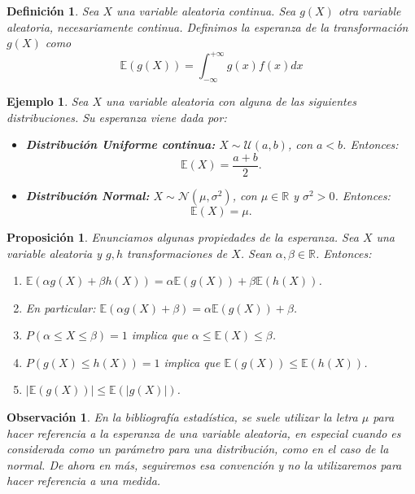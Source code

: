 \documentclass{report}
\newtheorem{prop}{Proposición}[section]
\newtheorem{dfn}{Definición}[section]
\newtheorem{obs}{Observación}[section]
\newtheorem{ej}{Ejemplo}[section]
\begin{document}
\begin{dfn}
Sea $X$ una variable aleatoria continua. Sea $g(X)$ otra variable aleatoria, necesariamente continua.
Definimos la esperanza de la transformación $g(X)$ como
\begin{equation*}
\mathbb{E}(g(X)) = \int_{-\infty}^{+\infty} g(x)f(x)dx
\end{equation*}
\end{dfn}

\begin{ej}
Sea \( X \) una variable aleatoria con alguna de las siguientes distribuciones. Su esperanza viene dada por:

\begin{itemize}
    \item \textbf{Distribución Uniforme continua:} \( X \sim \mathcal{U}(a, b) \), con \( a < b \). Entonces:
    \[
    \mathbb{E}(X) = \frac{a + b}{2}.
    \]

    \item \textbf{Distribución Normal:} \( X \sim \mathcal{N}(\mu, \sigma^2) \), con \( \mu \in \mathbb{R} \) y \( \sigma^2 > 0 \). Entonces:
    \[
    \mathbb{E}(X) = \mu.
    \]
\end{itemize}
\end{ej}

\begin{prop}
    Enunciamos algunas propiedades de la esperanza. Sea $X$ una variable aleatoria y $g,h$ transformaciones
    de $X$. Sean $\alpha,\beta\in\mathbb{R}$. Entonces:
    \begin{enumerate}
        \item $\mathbb{E}(\alpha g(X) + \beta h(X)) = \alpha \mathbb{E}(g(X))+ \beta \mathbb{E}(h(X))$.
        \item En particular: $\mathbb{E}(\alpha g(X) + \beta) = \alpha\mathbb{E}( g(X) ) + \beta$.
        \item $P(\alpha\leq X \leq \beta) = 1$ implica que $\alpha\leq \mathbb{E}(X) \leq \beta$.
        \item $P(g(X)\leq h(X)) = 1$ implica que $\mathbb{E}(g(X)) \leq \mathbb{E}(h(X))$.
        \item $|\mathbb{E}(g(X))|\leq \mathbb{E}(|g(X)|)$.
    \end{enumerate}
\end{prop}


\begin{obs}
    En la bibliografía estadística, se suele utilizar la letra $\mu$ para hacer referencia a la esperanza
    de una variable aleatoria, en especial cuando es considerada como un parámetro para una distribución,
    como en el caso de la normal. De ahora en más, seguiremos esa convención y no la utilizaremos para
    hacer referencia a una medida.
\end{obs}
\end{document}
